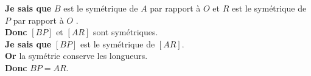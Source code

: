 \documentclass[12pt,a4paper]{article}
\begin{document}
\noindent \textbf{Je sais que} $B$ est le symétrique de $A$ par rapport à $O$ et $R$ est le symétrique de $P$ par rapport à $O$ .\\
\textbf{Donc} $[BP]$ et $[AR]$ sont symétriques.\\

\noindent \textbf{Je sais que} $[BP]$ est le symétrique de $[AR]$.\\
\textbf{Or} la symétrie conserve les longueurs.\\
\textbf{Donc} $BP = AR$.
\end{document}
